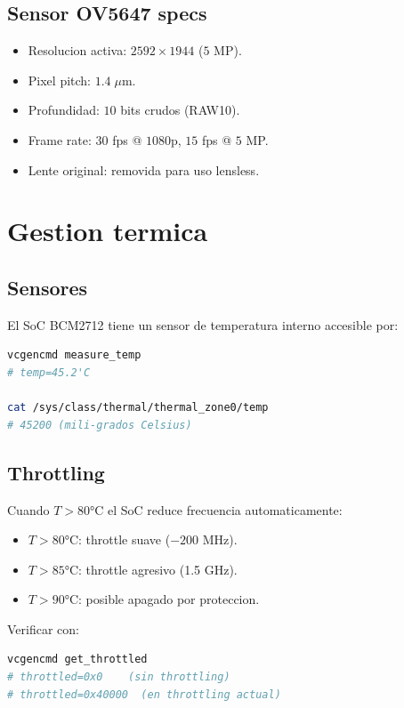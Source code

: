 \documentclass[11pt,a4paper,oneside]{report}
\begin{document}
\section{Sensor OV5647 specs}

\begin{itemize}[leftmargin=2em]
  \item Resolucion activa: $2592 \times 1944$ ($5$ MP).
  \item Pixel pitch: $1.4\;\mu$m.
  \item Profundidad: $10$ bits crudos (RAW10).
  \item Frame rate: $30$ fps @ $1080$p, $15$ fps @ $5$ MP.
  \item Lente original: removida para uso lensless.
\end{itemize}

\chapter{Gestion termica}

\section{Sensores}

El SoC BCM2712 tiene un sensor de temperatura interno accesible por:

\begin{lstlisting}[language=bash]
vcgencmd measure_temp
# temp=45.2'C

cat /sys/class/thermal/thermal_zone0/temp
# 45200 (mili-grados Celsius)
\end{lstlisting}

\section{Throttling}

Cuando $T > 80$°C el SoC reduce frecuencia automaticamente:

\begin{itemize}[leftmargin=2em]
  \item $T > 80$°C: throttle suave ($-200$ MHz).
  \item $T > 85$°C: throttle agresivo (1.5 GHz).
  \item $T > 90$°C: posible apagado por proteccion.
\end{itemize}

Verificar con:
\begin{lstlisting}[language=bash]
vcgencmd get_throttled
# throttled=0x0    (sin throttling)
# throttled=0x40000  (en throttling actual)
\end{lstlisting}
\end{document}

